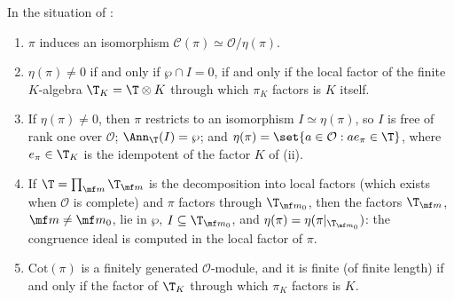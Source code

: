 \begin{proposition}\label{prop:congruence:congruence-module}
In the situation of :
\begin{enumerate}[label=(\roman*)]
\item $\pi$ induces an isomorphism $\mathcal C(\pi)\simeq\mathcal O/\eta(\pi)$.
\item $\eta(\pi)\ne0$ if and only if $\wp\cap I=0$, if and only if the local factor of the finite $K$-algebra $\T_K=\T\otimes K$ through which $\pi_K$ factors is $K$ itself.
\item If $\eta(\pi)\ne0$, then $\pi$ restricts to an isomorphism $I\simeq\eta(\pi)$, so $I$ is free of rank one over $\mathcal O$; $\Ann_\T(I)=\wp$; and $\eta(\pi)=\set{a\in\mathcal O:ae_\pi\in\T}$, where
$e_\pi\in\T_K$ is the idempotent of the factor $K$ of (ii).
\item If $\T=\prod_{\mf m}\T_{\mf m}$ is the decomposition into local factors (which exists when $\mathcal O$ is complete) and $\pi$ factors through $\T_{\mf m_0}$, then the factors $\T_{\mf m}$, $\mf m\ne\mf m_0$, lie in $\wp$, $I\subseteq\T_{\mf m_0}$,
and $\eta(\pi)=\eta(\pi|_{\T_{\mf m_0}})$: the congruence ideal is computed in the local factor of $\pi$.
\item $\mathrm{Cot}(\pi)$ is a finitely generated $\mathcal O$-module, and it is finite (of finite length) if and only if the factor of $\T_K$ through which $\pi_K$ factors is $K$.
\end{enumerate}
\end{proposition}

